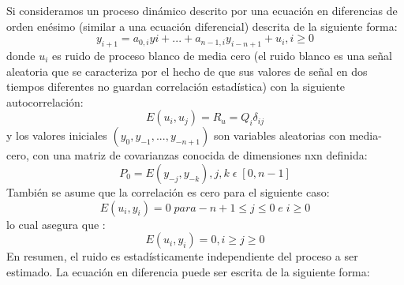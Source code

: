 Si consideramos un proceso dinámico descrito por una ecuación en diferencias de orden enésimo (similar a una ecuación diferencial) descrita de la siguiente forma:
\begin{equation}\label{ecuacionendiferencias_orden_n}
y_{i+1} = a_{0,i}y{i} + ... + a_{n-1,i}y_{i-n+1}+u_{i},i \ge 0
\end{equation}
donde $u_{i}$ es ruido de proceso blanco de media cero (el ruido blanco es una señal aleatoria que se caracteriza por el hecho de que sus valores de señal en dos tiempos diferentes no guardan correlación estadística) con la siguiente autocorrelación:
\begin{equation}\label{Autocorrelacion}
E(u_{i},u_{j}) = R_{u} = Q_{i}\delta_{ij}
\end{equation}
y los valores iniciales $(y_{0},y_{-1},...,y_{-n+1})$ son variables aleatorias con media-cero, con una matriz de covarianzas conocida de dimensiones nxn definida:
\begin{equation}\label{matrizdecovarianza}
P_{0} = E(y_{-j},y_{-k}),j,k\; \epsilon \;[0,n-1]
\end{equation}
También se asume que la correlación es cero para el siguiente caso:
\begin{equation}\label{correlacion_cero}
E(u_{i},y_{i}) = 0 \; para -n+1 \le j \le 0 \; e \; i\ge 0
\end{equation}
lo cual asegura  que \cite{AnIntroductionToTheKalmanFilter}:
%
%
%
\begin{equation}\label{correlacion_cero_1}
E(u_{i},y_{i}) = 0 ,i \ge j\ge 0
\end{equation}
En resumen, el ruido es estadísticamente independiente del proceso a ser estimado. La ecuación en diferencia puede ser escrita de la siguiente forma:
